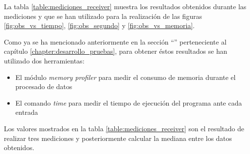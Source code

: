 La tabla \ref{table:mediciones_receiver} muestra los resultados obtenidos durante las mediciones y que se han utilizado para la realización de las figuras \ref{fig:obs_vs_tiempo}, \ref{fig:obs_segundo} y \ref{fig:obs_vs_memoria}.

Como ya se ha mencionado anteriormente en la sección ``'' perteneciente al capítulo \ref{chapter:desarrollo_pruebas}, para obtener éstos resultados se han utilizado dos herramientas:
\begin{itemize}
	\item
		El módulo \textit{memory profiler} para medir el consumo de memoria durante el procesado de datos
	\item
		El comando \textit{time} para medir el tiempo de ejecución del programa ante cada entrada
\end{itemize}
Los valores mostrados en la tabla \ref{table:mediciones_receiver} son el resultado de realizar tres mediciones y posteriormente calcular la mediana entre los datos obtenidos.
